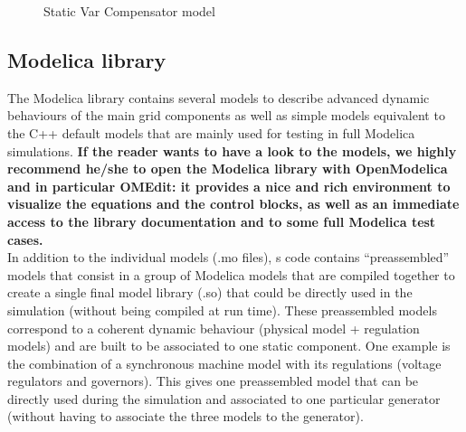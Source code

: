 \documentclass[a4paper, 12pt]{report}
\begin{document}
\begin{figure}[h]
  \setlength{\abovecaptionskip}{15pt}
\centering
 \caption{Static Var Compensator model}
 \label{StaticVarCompensator}
\end{figure}

\subsection{Modelica library}

The \Dynawo Modelica library contains several models to describe advanced dynamic behaviours of the main grid components as well as simple models equivalent to the C++ default models that are mainly used for testing in full Modelica simulations. \textbf{If the reader wants to have a look to the models, we highly recommend he/she to open the \Dynawo Modelica library with OpenModelica and in particular OMEdit: it provides a nice and rich environment to visualize the equations and the control blocks, as well as an immediate access to the library documentation and to some full Modelica test cases. } \\

In addition to the individual models (.mo files), \Dynawo\textquotesingle s code contains ``preassembled'' models that consist in a group of Modelica models that are compiled together to create a single final model library (.so) that could be directly used in the simulation (without being compiled at run time). These preassembled models correspond to a coherent dynamic behaviour (physical model + regulation models) and are built to be associated to one static component. One example is the combination of a synchronous machine model with its regulations (voltage regulators and governors). This gives one preassembled model that can be directly used during the simulation and associated to one particular generator (without having to associate the three models to the generator).
\end{document}
